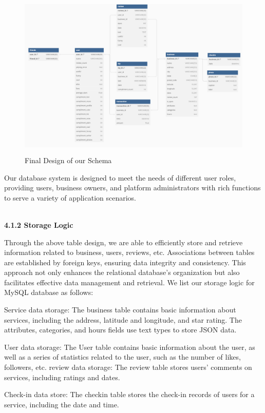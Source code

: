 \documentclass[runningheads]{llncs}
\begin{document}
\begin{figure}[!h]
\centering
\includegraphics[height=8cm]{figs/schema_2.png}
\caption{Final Design of our Schema}
\label{fig:sch2}
\end{figure}

Our database system is designed to meet the needs of different user roles, providing users, business owners, and platform administrators with rich functions to serve a variety of application scenarios.


\textbf{\\4.1.2 Storage Logic\\}

Through the above table design, we are able to efficiently store and retrieve information related to business, users, reviews, etc. Associations between tables are established by foreign keys, ensuring data integrity and consistency. This approach not only enhances the relational database's organization but also facilitates effective data management and retrieval. We list our storage logic for MySQL database as follows:

Service data storage: The business table contains basic information about services, including the address, latitude and longitude, and star rating. The attributes, categories, and hours fields use text types to store JSON data.

User data storage: The User table contains basic information about the user, as well as a series of statistics related to the user, such as the number of likes, followers, etc.
review data storage: The review table stores users' comments on services, including ratings and dates.

Check-in data store: The checkin table stores the check-in records of users for a service, including the date and time.
\end{document}
